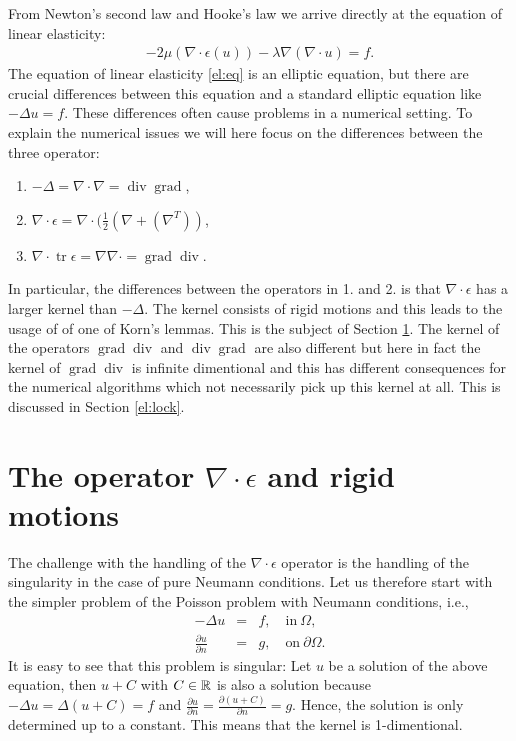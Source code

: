 From Newton's second law and Hooke's law we arrive directly at the equation of linear elasticity: 
\begin{align}
\label{el:eq}
-2 \mu (\nabla \cdot \epsilon (u)) - \lambda \nabla (\nabla \cdot u) = f.
\end{align}
The equation of linear elasticity \eqref{el:eq} is an elliptic equation, but there are crucial differences between this equation
and a standard elliptic equation like $-\Delta u = f$. These differences often cause
problems in a numerical setting. To explain the numerical issues we will here
focus on the differences between the three operator:
\begin{enumerate}
\item $-\Delta  = \nabla\cdot\nabla  = \operatorname{div}\operatorname{grad} $,
\item $\nabla \cdot \epsilon = \nabla\cdot(\frac{1}{2}(\nabla + (\nabla^T))$,
\item $\nabla \cdot \operatorname{tr} \epsilon = \nabla \nabla \cdot = \operatorname{grad} \operatorname{div}$. 
\end{enumerate}
In particular, the differences between the operators in 1. and 2. is that $\nabla \cdot \epsilon$ has a
larger kernel than $-\Delta$. The kernel consists of rigid motions and this leads to the usage of
of one of Korn's lemmas.
This is the subject of Section \ref{el:korn}. The kernel of the operators  
$\operatorname{grad} \operatorname{div}$ and $\operatorname{div}\operatorname{grad}$
are also different but here in fact the kernel of $\operatorname{grad} \operatorname{div}$ is infinite dimentional
and this has different consequences for the numerical algorithms which not necessarily pick up this kernel at
all. This is discussed in Section \ref{el:lock}.

\section{The operator $\nabla \cdot \epsilon$ and rigid motions}
\label{el:korn}
The challenge with the handling of the $\nabla \cdot \epsilon$ operator is the
handling of the singularity in the case of pure Neumann conditions. Let us therefore
start with the simpler problem of the Poisson problem with Neumann conditions, i.e., 
\begin{eqnarray}
-\Delta u &=& f, \quad \mbox{in}\ \Omega, \\
\frac{\partial u}{\partial n} &=& g, \quad \mbox{on}\ \partial \Omega .
\end{eqnarray}
It is easy to see that this problem is singular: Let $u$ be a solution
of the above equation, then $u+C$ with $C\in\mathbb{R}$ is also a solution because
$-\Delta u = \Delta (u + C) = f$ and
$\frac{\partial u}{\partial n} = \frac{\partial (u+C)}{\partial n} = g$.
Hence, the solution is only determined up to a constant. This means
that  the kernel  is 1-dimentional.

